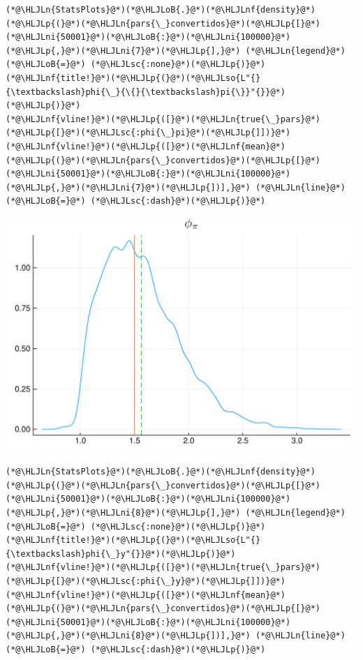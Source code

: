 \documentclass[12pt,a4paper]{article}
\newcommand{\HLJLn}[1]{#1}
\newcommand{\HLJLnf}[1]{\textcolor[RGB]{66,102,213}{#1}}
\newcommand{\HLJLsc}[1]{\textcolor[RGB]{201,61,57}{#1}}
\newcommand{\HLJLso}[1]{\textcolor[RGB]{201,61,57}{#1}}
\newcommand{\HLJLni}[1]{\textcolor[RGB]{59,151,46}{#1}}
\newcommand{\HLJLoB}[1]{\textcolor[RGB]{102,102,102}{\textbf{#1}}}
\newcommand{\HLJLp}[1]{#1}
\begin{document}
\begin{lstlisting}
(*@\HLJLn{StatsPlots}@*)(*@\HLJLoB{.}@*)(*@\HLJLnf{density}@*)(*@\HLJLp{(}@*)(*@\HLJLn{pars{\_}convertidos}@*)(*@\HLJLp{[}@*)(*@\HLJLni{50001}@*)(*@\HLJLoB{:}@*)(*@\HLJLni{100000}@*)(*@\HLJLp{,}@*)(*@\HLJLni{7}@*)(*@\HLJLp{],}@*) (*@\HLJLn{legend}@*) (*@\HLJLoB{=}@*) (*@\HLJLsc{:none}@*)(*@\HLJLp{)}@*)
(*@\HLJLnf{title!}@*)(*@\HLJLp{(}@*)(*@\HLJLso{L"{}{\textbackslash}phi{\_}{\{}{\textbackslash}pi{\}}"{}}@*)(*@\HLJLp{)}@*)
(*@\HLJLnf{vline!}@*)(*@\HLJLp{([}@*)(*@\HLJLn{true{\_}pars}@*)(*@\HLJLp{[}@*)(*@\HLJLsc{:phi{\_}pi}@*)(*@\HLJLp{]])}@*)
(*@\HLJLnf{vline!}@*)(*@\HLJLp{([}@*)(*@\HLJLnf{mean}@*)(*@\HLJLp{(}@*)(*@\HLJLn{pars{\_}convertidos}@*)(*@\HLJLp{[}@*)(*@\HLJLni{50001}@*)(*@\HLJLoB{:}@*)(*@\HLJLni{100000}@*)(*@\HLJLp{,}@*)(*@\HLJLni{7}@*)(*@\HLJLp{])],}@*) (*@\HLJLn{line}@*) (*@\HLJLoB{=}@*) (*@\HLJLsc{:dash}@*)(*@\HLJLp{)}@*)
\end{lstlisting}

\includegraphics[width=\linewidth]{figures/dsge_and_julia_31_1.pdf}

\begin{lstlisting}
(*@\HLJLn{StatsPlots}@*)(*@\HLJLoB{.}@*)(*@\HLJLnf{density}@*)(*@\HLJLp{(}@*)(*@\HLJLn{pars{\_}convertidos}@*)(*@\HLJLp{[}@*)(*@\HLJLni{50001}@*)(*@\HLJLoB{:}@*)(*@\HLJLni{100000}@*)(*@\HLJLp{,}@*)(*@\HLJLni{8}@*)(*@\HLJLp{],}@*) (*@\HLJLn{legend}@*) (*@\HLJLoB{=}@*) (*@\HLJLsc{:none}@*)(*@\HLJLp{)}@*)
(*@\HLJLnf{title!}@*)(*@\HLJLp{(}@*)(*@\HLJLso{L"{}{\textbackslash}phi{\_}y"{}}@*)(*@\HLJLp{)}@*)
(*@\HLJLnf{vline!}@*)(*@\HLJLp{([}@*)(*@\HLJLn{true{\_}pars}@*)(*@\HLJLp{[}@*)(*@\HLJLsc{:phi{\_}y}@*)(*@\HLJLp{]])}@*)
(*@\HLJLnf{vline!}@*)(*@\HLJLp{([}@*)(*@\HLJLnf{mean}@*)(*@\HLJLp{(}@*)(*@\HLJLn{pars{\_}convertidos}@*)(*@\HLJLp{[}@*)(*@\HLJLni{50001}@*)(*@\HLJLoB{:}@*)(*@\HLJLni{100000}@*)(*@\HLJLp{,}@*)(*@\HLJLni{8}@*)(*@\HLJLp{])],}@*) (*@\HLJLn{line}@*) (*@\HLJLoB{=}@*) (*@\HLJLsc{:dash}@*)(*@\HLJLp{)}@*)
\end{lstlisting}
\end{document}
